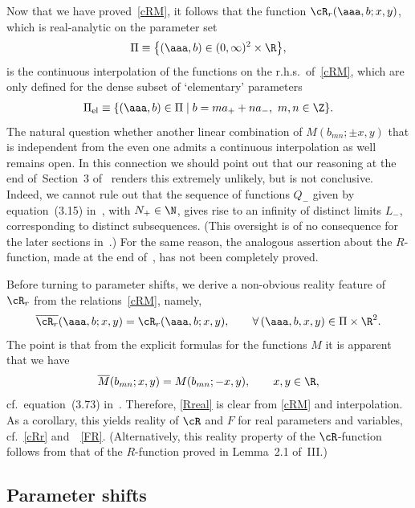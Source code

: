 \documentclass[pdftex]{sigma}
\numberwithin{equation}{section}
\begin{document}
Now that we have proved~\eqref{cRM},  it follows that the function $\cR_r(\aaa,b;x,y)$, which is real-analytic on the parameter set
\begin{gather}\label{Pi}
\Pi\equiv \big\{(\aaa,b)\in (0,\infty)^2\times\R\big\},
\end{gather}
 is the continuous interpolation of the functions on the r.h.s.\ of~\eqref{cRM}, which are only def\/ined for the dense subset of `elementary' parameters
\begin{gather}\label{elem}
\Pi_{\rm el}\equiv \{ (\aaa,b)\in\Pi \mid b=ma_{+}+na_{-},\ m,n\in\Z\}.
\end{gather}
The natural question whether another linear combination of $M(b_{mn};\pm x,y)$ that is independent from the even one admits a continuous interpolation as well remains open. In this connection we should point out  that our reasoning at the end of~Section~3 of~\cite{koor} renders this extremely unlikely, but is not conclusive. Indeed, we cannot rule out that the sequence of functions $Q_{-}$ given by equation~(3.15) in~\cite{koor}, with $N_{+}\in\N$, gives rise to an inf\/inity of distinct limits $L_{-}$, corresponding to distinct subsequences. (This oversight is of no consequence for the later sections in~\cite{koor}.) For the same reason, the analogous assertion about the $R$-function, made at the end of~\cite{Rsurv}, has not been completely proved.

Before turning to parameter shifts, we derive  a non-obvious reality feature of $\cR_r$ from the  relations~\eqref{cRM}, namely,
\begin{gather}\label{Rreal}
\overline{\cR_r}(\aaa,b;x,y)=\cR_r(\aaa,b;x,y),\qquad \forall\, (\aaa,b,x,y)\in\Pi\times\R^2.
\end{gather}
The point is that from the explicit formulas for the functions $M$ it is apparent that we have
\begin{gather}
\overline{M}(b_{mn};x,y)=M(b_{mn};-x,y), \qquad x,y\in\R,
\end{gather}
cf.~equation~(3.73) in~\cite{GLFII}. Therefore, \eqref{Rreal} is clear from \eqref{cRM} and interpolation. As a corollary, this yields reality of $\cR$ and $F$ for real parameters and variables, cf.~\eqref{cRr} and~~\eqref{FR}. (Alternatively, this reality property of the $\cR$-function follows from that of the $R$-function proved in Lemma~2.1 of~III.)

\subsection{Parameter shifts}\label{section2.4}
\end{document}
